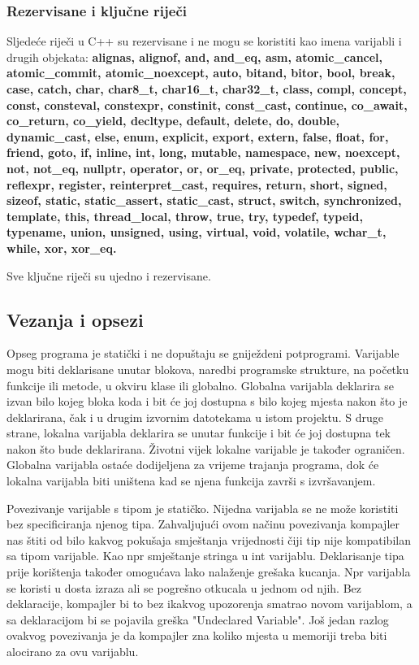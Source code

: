 \documentclass[11pt]{book}
\begin{document}
\subsubsection{Rezervisane i ključne riječi}
Sljedeće riječi u C++ su rezervisane i ne mogu se koristiti kao imena varijabli i drugih objekata:
\textbf{alignas, alignof, and, and_eq, asm, atomic_cancel, atomic_commit, atomic_noexcept, auto,
  bitand, bitor, bool, break, case, catch, char, char8\_t, char16\_t, char32\_t, class, compl,
  concept, const, consteval, constexpr, constinit, const_cast, continue, co_await,
  co_return, co_yield, decltype, default, delete, do, double, dynamic_cast, else,
  enum, explicit, export, extern, false, float, for, friend, goto, if, inline, int,
  long, mutable, namespace, new, noexcept, not, not_eq, nullptr, operator, or, or\_eq,
  private, protected, public, reflexpr, register, reinterpret_cast, requires,
  return, short, signed, sizeof, static, static_assert, static\_cast, struct,
  switch, synchronized, template, this, thread\_local, throw, true, try, typedef,
  typeid, typename, union, unsigned, using, virtual, void, volatile, wchar\_t, while, xor, xor\_eq.
}

Sve ključne riječi su ujedno i rezervisane.
\subsection{Vezanja i opsezi}

Opseg programa je statički i ne dopuštaju se gniježdeni potprogrami. Varijable mogu biti deklarisane unutar blokova, naredbi programske strukture, na početku funkcije ili metode, u okviru klase ili globalno. Globalna varijabla deklarira se izvan bilo kojeg bloka koda i bit će joj dostupna s bilo kojeg mjesta nakon što je deklarirana, čak i u drugim izvornim datotekama u istom projektu. S druge strane, lokalna varijabla deklarira se unutar funkcije i bit će joj dostupna tek nakon što bude deklarirana. Životni vijek lokalne varijable je također ograničen. Globalna varijabla ostaće dodijeljena za vrijeme trajanja programa, dok će lokalna varijabla biti uništena kad se njena funkcija završi s izvršavanjem.

Povezivanje varijable s tipom  je statičko. Nijedna varijabla se ne može koristiti bez specificiranja njenog tipa. Zahvaljujući ovom načinu povezivanja kompajler nas štiti od bilo kakvog pokušaja smještanja vrijednosti čiji tip nije kompatibilan sa tipom varijable. Kao npr smještanje stringa u int varijablu. Deklarisanje tipa prije korištenja također  omogućava lako nalaženje grešaka kucanja. Npr varijabla se koristi u dosta izraza ali se pogrešno otkucala u jednom od njih. Bez deklaracije, kompajler bi to bez ikakvog upozorenja smatrao novom varijablom, a sa deklaracijom bi se pojavila greška "Undeclared Variable". Još jedan razlog ovakvog povezivanja je da kompajler zna koliko mjesta u memoriji treba biti alocirano za ovu varijablu.
\end{document}
